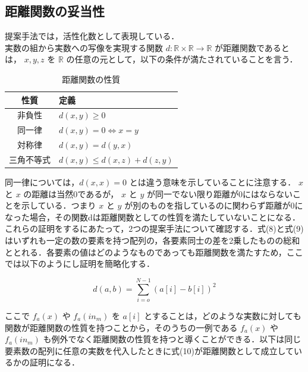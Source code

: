 \clearpage
\subsection{距離関数の妥当性}
提案手法では，活性化数として表現している． \\
実数の組から実数への写像を実現する関数 $ d: \mathbb{R} \times \mathbb{R} \rightarrow \mathbb{R} $ が距離関数であるとは， $ x, y, z $ を $ \mathbb{R} $ の任意の元として，以下の条件が満たされていることを言う\cite{距離関数}．

\begin{table}[H]
    \caption{距離関数の性質}
    \centering
    \begin{tabular}{cl}
        \hline
        性質  & 定義 \\
        \hline \hline
        非負性     & $ d(x, y) \geq 0 $ \\
        同一律     & $ d(x, y) = 0 \Leftrightarrow x = y $ \\
        対称律     & $ d(x, y) = d(y, x) $ \\
        三角不等式 & $ d(x, y) \leq d(x, z) + d(z, y) $ \\
        \hline
    \end{tabular}
\end{table}

同一律については，$ d(x, x) = 0 $ とは違う意味を示していることに注意する． $ x $ と $ x $ の距離は当然0であるが， $ x $ と $ y $ が同一でない限り距離が0にはならないことを示している．つまり $ x $ と $ y $ が別のものを指しているのに関わらず距離が0になった場合，その関数dは距離関数としての性質を満たしていないことになる．これらの証明をするにあたって，2つの提案手法について確認する．式(8)と式(9)はいずれも一定の数の要素を持つ配列の，各要素同士の差を2乗したものの総和ととれる．各要素の値はどのようなものであっても距離関数を満たすため，ここでは以下のようにし証明を簡略化する．

\begin{equation}
    d(a, b) = \sum_{i=o}^{N-1}(a[i] - b[i])^2
\end{equation}

ここで $ f_{a}(x) $ や $ f_{a}(in_{m}) $ を $ a[i] $ とすることは，どのような実数に対しても関数が距離関数の性質を持つことから，そのうちの一例である $ f_{a}(x) $ や $ f_{a}(in_{m}) $ も例外でなく距離関数の性質を持つと導くことができる．以下は同じ要素数の配列に任意の実数を代入したときに式(10)が距離関数として成立しているかの証明になる．

